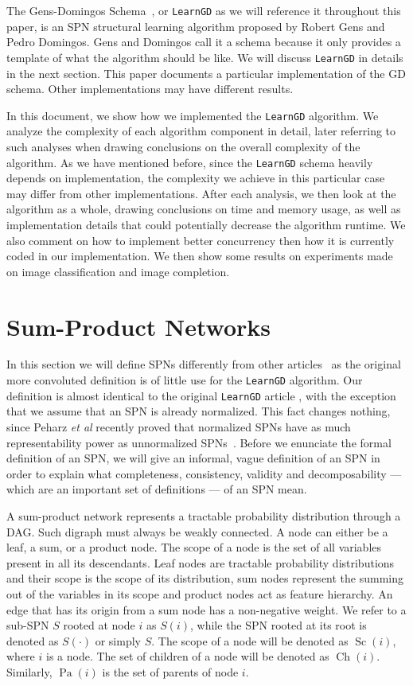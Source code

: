 \documentclass{amsart}
\DeclareMathOperator*{\Ch}{\text{Ch}}
\DeclareMathOperator*{\Pa}{\text{Pa}}
\DeclareMathOperator*{\Sc}{\text{Sc}}
\theoremstyle{plain}
\numberwithin{equation}{section}
\newcommand{\code}[1]{\lstinline[mathescape=true]{#1}}
\begin{document}
The Gens-Domingos Schema~\cite{gens-domingos}, or \code{LearnGD} as we will reference it throughout
this paper, is an SPN structural learning algorithm proposed by Robert Gens and Pedro Domingos.
Gens and Domingos call it a schema because it only provides a template of what the algorithm should
be like. We will discuss \code{LearnGD} in details in the next section. This paper documents a
particular implementation of the GD schema. Other implementations may have different results.

In this document, we show how we implemented the \code{LearnGD} algorithm. We analyze the
complexity of each algorithm component in detail, later referring to such analyses when drawing
conclusions on the overall complexity of the algorithm. As we have mentioned before, since the
\code{LearnGD} schema heavily depends on implementation, the complexity we achieve in this
particular case may differ from other implementations. After each analysis, we then look at the
algorithm as a whole, drawing conclusions on time and memory usage, as well as implementation
details that could potentially decrease the algorithm runtime. We also comment on how to implement
better concurrency then how it is currently coded in our implementation. We then show some results
on experiments made on image classification and image completion.

\section{Sum-Product Networks}

In this section we will define SPNs differently from other articles~\cite{gens-domingos,
poon-domingos, clustering} as the original more convoluted definition is of little use for the
\code{LearnGD} algorithm. Our definition is almost identical to the original \code{LearnGD} article
\cite{gens-domingos}, with the exception that we assume that an SPN is already normalized. This
fact changes nothing, since Peharz \textit{et al} recently proved that normalized SPNs have as much
representability power as unnormalized SPNs~\cite{theoretical-spn}. Before we enunciate the formal
definition of an SPN, we will give an informal, vague definition of an SPN in order to explain what
completeness, consistency, validity and decomposability --- which are an important set of
definitions --- of an SPN mean.

A sum-product network represents a tractable probability distribution through a DAG\@. Such digraph
must always be weakly connected. A node can either be a leaf, a sum, or a product node. The scope
of a node is the set of all variables present in all its descendants. Leaf nodes are tractable
probability distributions and their scope is the scope of its distribution, sum nodes represent the
summing out of the variables in its scope and product nodes act as feature hierarchy. An edge that
has its origin from a sum node has a non-negative weight. We refer to a sub-SPN $S$ rooted at node
$i$ as $S(i)$, while the SPN rooted at its root is denoted as $S(\cdot)$ or simply $S$. The scope
of a node will be denoted as $\Sc(i)$, where $i$ is a node. The set of children of a node will be
denoted as $\Ch(i)$. Similarly, $\Pa(i)$ is the set of parents of node $i$.
\end{document}
